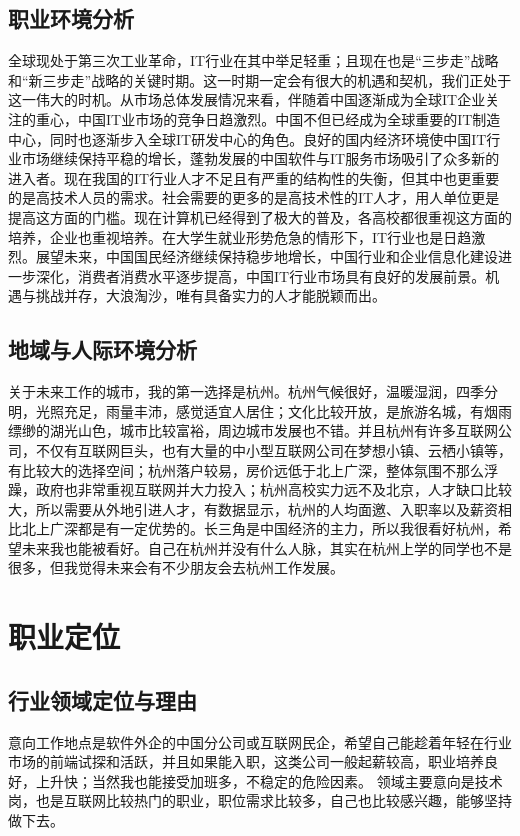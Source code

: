 \documentclass{article}
\begin{document}
\subsection{职业环境分析}
全球现处于第三次工业革命，IT行业在其中举足轻重；且现在也是“三步走”战略和“新三步走”战略的关键时期。这一时期一定会有很大的机遇和契机，我们正处于这一伟大的时机。从市场总体发展情况来看，伴随着中国逐渐成为全球IT企业关注的重心，中国IT业市场的竞争日趋激烈。中国不但已经成为全球重要的IT制造中心，同时也逐渐步入全球IT研发中心的角色。良好的国内经济环境使中国IT行业市场继续保持平稳的增长，蓬勃发展的中国软件与IT服务市场吸引了众多新的进入者。现在我国的IT行业人才不足且有严重的结构性的失衡，但其中也更重要的是高技术人员的需求。社会需要的更多的是高技术性的IT人才，用人单位更是提高这方面的门槛。现在计算机已经得到了极大的普及，各高校都很重视这方面的培养，企业也重视培养。在大学生就业形势危急的情形下，IT行业也是日趋激烈。展望未来，中国国民经济继续保持稳步地增长，中国行业和企业信息化建设进一步深化，消费者消费水平逐步提高，中国IT行业市场具有良好的发展前景。机遇与挑战并存，大浪淘沙，唯有具备实力的人才能脱颖而出。\par


\subsection{地域与人际环境分析}
关于未来工作的城市，我的第一选择是杭州。杭州气候很好，温暖湿润，四季分明，光照充足，雨量丰沛，感觉适宜人居住；文化比较开放，是旅游名城，有烟雨缥缈的湖光山色，城市比较富裕，周边城市发展也不错。并且杭州有许多互联网公司，不仅有互联网巨头，也有大量的中小型互联网公司在梦想小镇、云栖小镇等，有比较大的选择空间；杭州落户较易，房价远低于北上广深，整体氛围不那么浮躁，政府也非常重视互联网并大力投入；杭州高校实力远不及北京，人才缺口比较大，所以需要从外地引进人才，有数据显示，杭州的人均面邀、入职率以及薪资相比北上广深都是有一定优势的。长三角是中国经济的主力，所以我很看好杭州，希望未来我也能被看好。自己在杭州并没有什么人脉，其实在杭州上学的同学也不是很多，但我觉得未来会有不少朋友会去杭州工作发展。\par




\section{职业定位}
\par
\par

\subsection{行业领域定位与理由}
意向工作地点是软件外企的中国分公司或互联网民企，希望自己能趁着年轻在行业市场的前端试探和活跃，并且如果能入职，这类公司一般起薪较高，职业培养良好，上升快；当然我也能接受加班多，不稳定的危险因素。
领域主要意向是技术岗，也是互联网比较热门的职业，职位需求比较多，自己也比较感兴趣，能够坚持做下去。
\par
\end{document}
